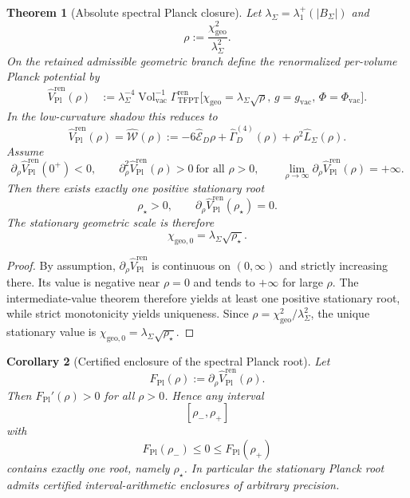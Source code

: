 \documentclass[11pt,a4paper]{article}
\newtheorem{theorem}{Theorem}[section]
\newtheorem{corollary}[theorem]{Corollary}
\theoremstyle{definition}
\theoremstyle{remark}
\newcommand{\chigeo}{\chi_{\mathrm{geo}}}
\newcommand{\chigeozero}{\chi_{\mathrm{geo},0}}
\begin{document}
\begin{theorem}[Absolute spectral Planck closure]
\label{thm:absolute-spectral-planck-closure}
\label{thm:stationary_geometric_scale_equation}
Let $\lambda_\Sigma=\lambda_1^+(|B_\Sigma|)$ and
\[
\rho:=\frac{\chigeo^2}{\lambda_\Sigma^2}.
\]
On the retained admissible geometric branch define the renormalized per-volume Planck potential by
\[
\begin{aligned}
\widehat V_{\mathrm{Pl}}^{\mathrm{ren}}(\rho)
&:=
\lambda_\Sigma^{-4}\operatorname{Vol}_{\mathrm{vac}}^{-1}
\Gamma_{\mathrm{TFPT}}^{\mathrm{ren}}
\bigl[\chigeo=\lambda_\Sigma\sqrt{\rho},\,g=g_{\mathrm{vac}},\,\Phi=\Phi_{\mathrm{vac}}\bigr].
\end{aligned}
\]
In the low-curvature shadow this reduces to
\[
\widehat V_{\mathrm{Pl}}^{\mathrm{ren}}(\rho)=\widehat{\mathcal W}(\rho)
:=
-6\widehat{\mathcal E}_D\rho
+
\widehat\Gamma_D^{(4)}(\rho)
+
\rho^2\widehat L_\Sigma(\rho).
\]
Assume
\[
\partial_\rho\widehat V_{\mathrm{Pl}}^{\mathrm{ren}}(0^+)<0,
\qquad
\partial_\rho^2\widehat V_{\mathrm{Pl}}^{\mathrm{ren}}(\rho)>0\ \text{for all }\rho>0,
\qquad
\lim_{\rho\to\infty}\partial_\rho\widehat V_{\mathrm{Pl}}^{\mathrm{ren}}(\rho)=+\infty.
\]
Then there exists exactly one positive stationary root
\[
\rho_\star>0,
\qquad
\partial_\rho\widehat V_{\mathrm{Pl}}^{\mathrm{ren}}(\rho_\star)=0.
\]
The stationary geometric scale is therefore
\[
\chigeozero=\lambda_\Sigma\sqrt{\rho_\star}.
\]
\end{theorem}

\begin{proof}
By assumption, $\partial_\rho\widehat V_{\mathrm{Pl}}^{\mathrm{ren}}$ is continuous on $(0,\infty)$
and strictly increasing there. Its value is negative near $\rho=0$ and tends to $+\infty$ for
large $\rho$. The intermediate-value theorem therefore yields at least one positive stationary root,
while strict monotonicity yields uniqueness. Since $\rho=\chigeo^2/\lambda_\Sigma^2$, the unique
stationary value is
$\chigeozero=\lambda_\Sigma\sqrt{\rho_\star}$.
\end{proof}

\begin{corollary}[Certified enclosure of the spectral Planck root]
\label{cor:computable-spectral-planck-root}
Let
\[
F_{\mathrm{Pl}}(\rho):=\partial_\rho\widehat V_{\mathrm{Pl}}^{\mathrm{ren}}(\rho).
\]
Then $F_{\mathrm{Pl}}'(\rho)>0$ for all $\rho>0$. Hence any interval
\[
[\rho_-,\rho_+]
\]
with
\[
F_{\mathrm{Pl}}(\rho_-)\le 0\le F_{\mathrm{Pl}}(\rho_+)
\]
contains exactly one root, namely $\rho_\star$. In particular the stationary Planck root admits
certified interval-arithmetic enclosures of arbitrary precision.
\end{corollary}
\end{document}
